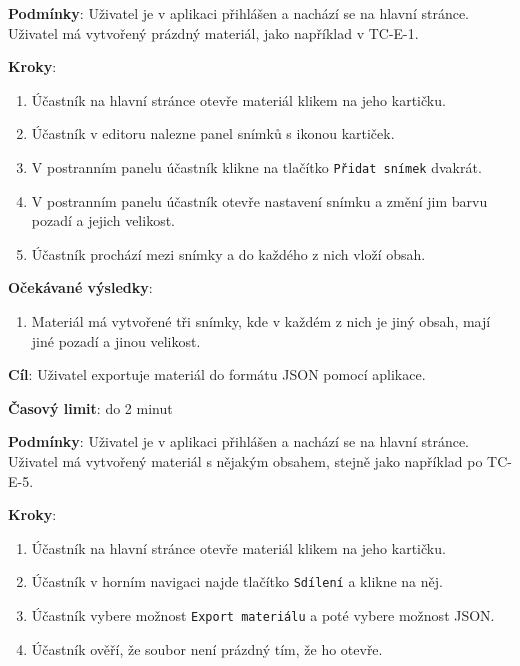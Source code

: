 \textbf{Podmínky}:  Uživatel je v aplikaci přihlášen a nachází se na hlavní stránce. Uživatel má vytvořený prázdný materiál, jako například v TC-E-1.

\textbf{Kroky}:

\begin{enumerate}[leftmargin=1.4cm]
    \item Účastník na hlavní stránce otevře materiál klikem na jeho kartičku.
    \item Účastník v editoru nalezne panel snímků s ikonou kartiček.
    \item V postranním panelu účastník klikne na tlačítko \verb|Přidat snímek| dvakrát.
    \item V postranním panelu účastník otevře nastavení snímku a změní jim barvu pozadí a jejich velikost.
    \item Účastník prochází mezi snímky a do každého z nich vloží obsah.
\end{enumerate}

\textbf{Očekávané výsledky}:

\begin{enumerate}[leftmargin=1.4cm]
    \item Materiál má vytvořené tři snímky, kde v každém z nich je jiný obsah, mají jiné pozadí a jinou velikost.
\end{enumerate}






\vspace{1em}

\textbf{Cíl}: Uživatel exportuje materiál do formátu JSON pomocí aplikace.

\textbf{Časový limit}: do 2 minut

\textbf{Podmínky}:  Uživatel je v aplikaci přihlášen a nachází se na hlavní stránce. Uživatel má vytvořený materiál s nějakým obsahem, stejně jako například po TC-E-5.

\textbf{Kroky}:

\begin{enumerate}[leftmargin=1.4cm]
    \item Účastník na hlavní stránce otevře materiál klikem na jeho kartičku.
    \item Účastník v horním navigaci najde tlačítko \verb|Sdílení| a klikne na něj.
    \item Účastník vybere možnost \verb|Export materiálu| a poté vybere možnost JSON.
    \item Účastník ověří, že soubor není prázdný tím, že ho otevře.
\end{enumerate}

